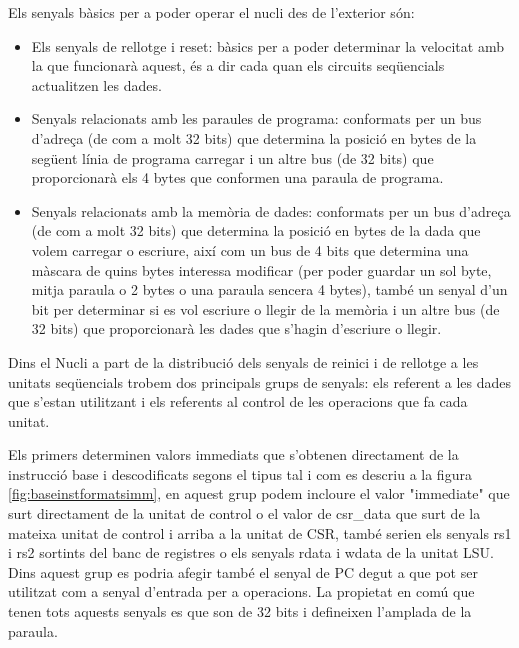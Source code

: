 \documentclass[10pt,a4paper,twocolumn,twoside]{article}
\begin{document}
        Els senyals bàsics per a poder operar el nucli des de l'exterior són:
        \begin{itemize}
            \item Els senyals de rellotge i reset: bàsics per a poder determinar la velocitat amb la que funcionarà aquest, és a dir cada quan els circuits seqüencials actualitzen les dades.
            \item Senyals relacionats amb les paraules de programa: conformats per un bus d'adreça (de com a molt 32 bits) que determina la posició en bytes de la següent línia de programa carregar i un altre bus (de 32 bits) que proporcionarà els 4 bytes que conformen una paraula de programa.
            \item Senyals relacionats amb la memòria de dades: conformats per un bus d'adreça (de com a molt 32 bits) que determina la posició en bytes de la dada que volem carregar o escriure, així com un bus de 4 bits que determina una màscara de quins bytes interessa modificar (per poder guardar un sol byte, mitja paraula o 2 bytes o una paraula sencera 4 bytes), també un senyal d'un bit per determinar si es vol escriure o llegir de la memòria i un altre bus (de 32 bits) que proporcionarà les dades que s'hagin d'escriure o llegir.
        \end{itemize}
        
        Dins el Nucli a part de la distribució dels senyals de reinici i de rellotge a les unitats seqüencials trobem dos principals grups de senyals: els referent a les dades que s'estan utilitzant i els referents al control de les operacions que fa cada unitat.
        
        Els primers determinen valors immediats que s'obtenen directament de la instrucció base i descodificats segons el tipus tal i com es descriu a la figura \ref{fig:baseinstformatsimm}, en aquest grup podem incloure el valor "immediate" que surt directament de la unitat de control o el valor de csr\_data que surt de la mateixa unitat de control i arriba a la unitat de CSR, també serien els senyals rs1 i rs2 sortints del banc de registres o els senyals rdata i wdata de la unitat LSU. Dins aquest grup es podria afegir també el senyal de PC degut a que pot ser utilitzat com a senyal d'entrada per a operacions. La propietat en comú que tenen tots aquests senyals es que son de 32 bits i defineixen l'amplada de la paraula.
        
\end{document}
